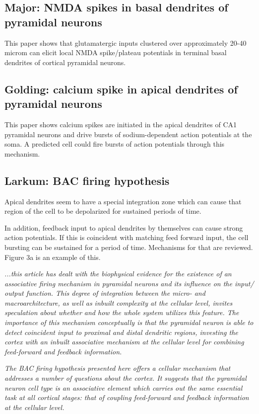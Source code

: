 \documentclass{article} %
\begin{document}
\subsection{Major: NMDA spikes in basal dendrites of pyramidal neurons}

This paper \cite{Major2008} shows that glutamatergic inputs clustered over 
approximately 20-40 microm can elicit local NMDA spike/plateau potentials in 
terminal basal dendrites of cortical pyramidal neurons.

\subsection{Golding: calcium spike in apical dendrites of pyramidal neurons}

This paper \cite{Golding1999} shows calcium spikes are initiated in the apical 
dendrites of CA1 pyramidal neurons and drive bursts of sodium-dependent action 
potentials at the soma. A predicted cell could fire bursts of action potentials 
through this mechanism. 

\subsection{Larkum: BAC firing hypothesis}

Apical dendrites seem to have a special integration zone which can cause that
region of the cell to be depolarized for sustained periods of time.

In addition, feedback input to apical dendrites by themselves can cause strong
action potentials.   If this is coincident with matching feed forward input, the
cell bursting can be sustained for a period of time. Mechanisms for that are
reviewed. Figure 3a is an example of this.

\emph{
...this article \cite{Larkum2013} has dealt with the biophysical
evidence for the existence of an associative firing mechanism in pyramidal
neurons and its influence on the input/ output function. This degree of
integration between the micro- and macroarchitecture, as well as inbuilt
complexity at the cellular level, invites speculation about whether and how the
whole system utilizes this feature. The importance of this mechanism
conceptually is that the pyramidal neuron is able to detect coincident input to
proximal and distal dendritic regions, investing the cortex with an inbuilt
associative mechanism at the cellular level for combining feed-forward and
feedback information.}

\emph{The BAC firing hypothesis presented here offers a cellular mechanism that
addresses a number of questions about the cortex. It suggests that the
pyramidal neuron cell type is an associative element which carries out the same
essential task at all cortical stages: that of coupling feed-forward and
feedback information at the cellular level.}
\end{document}
